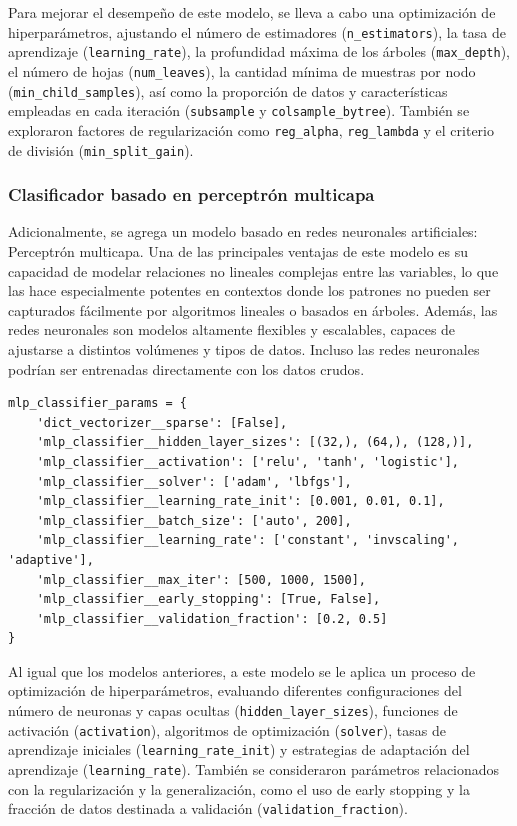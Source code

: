 \documentclass[11pt,a4paper,spanish]{book}
\numberwithin{equation}{chapter}
\numberwithin{figure}{chapter}
\begin{document}
Para mejorar el desempeño de este modelo, se lleva a cabo una optimización de 
hiperparámetros, ajustando el número de estimadores (\lstinline|n_estimators|), la tasa 
de aprendizaje (\lstinline|learning_rate|), la profundidad máxima de los árboles 
(\lstinline|max_depth|), el número de hojas (\lstinline|num_leaves|), la cantidad mínima 
de muestras por nodo (\lstinline|min_child_samples|), así como la proporción de datos y 
características empleadas en cada iteración (\lstinline|subsample| y 
\lstinline|colsample_bytree|). También se exploraron factores de regularización como 
\lstinline|reg_alpha|, \lstinline|reg_lambda| y el criterio de división 
(\lstinline|min_split_gain|). 



\subsubsection{Clasificador basado en perceptrón multicapa}

Adicionalmente, se agrega un modelo basado en redes neuronales artificiales: Perceptrón 
multicapa. Una de las principales ventajas de este modelo es su capacidad de modelar 
relaciones no lineales complejas entre las variables, lo que las hace especialmente 
potentes en contextos donde los patrones no pueden ser capturados fácilmente por 
algoritmos lineales o basados en árboles. Además, las redes neuronales son modelos 
altamente flexibles y escalables, capaces de ajustarse a distintos volúmenes y tipos de 
datos. Incluso las redes neuronales podrían ser entrenadas directamente con los datos 
crudos. 


\vspace{5mm}
\begin{lstlisting}
mlp_classifier_params = {
    'dict_vectorizer__sparse': [False],
    'mlp_classifier__hidden_layer_sizes': [(32,), (64,), (128,)],
    'mlp_classifier__activation': ['relu', 'tanh', 'logistic'],
    'mlp_classifier__solver': ['adam', 'lbfgs'],
    'mlp_classifier__learning_rate_init': [0.001, 0.01, 0.1],
    'mlp_classifier__batch_size': ['auto', 200],
    'mlp_classifier__learning_rate': ['constant', 'invscaling', 'adaptive'],
    'mlp_classifier__max_iter': [500, 1000, 1500],
    'mlp_classifier__early_stopping': [True, False],
    'mlp_classifier__validation_fraction': [0.2, 0.5]
}
\end{lstlisting}

Al igual que los modelos anteriores, a este modelo se le aplica un proceso de 
optimización de hiperparámetros, evaluando diferentes configuraciones del número de 
neuronas y capas ocultas (\lstinline|hidden_layer_sizes|), funciones de activación 
(\lstinline|activation|), algoritmos de optimización (\lstinline|solver|), tasas de 
aprendizaje iniciales (\lstinline|learning_rate_init|) y estrategias de adaptación del 
aprendizaje (\lstinline|learning_rate|). También se consideraron parámetros relacionados 
con la regularización y la generalización, como el uso de early stopping y la fracción 
de datos destinada a validación (\lstinline|validation_fraction|). 
\end{document}
